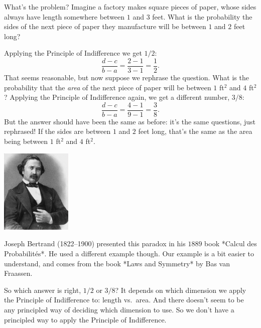 \documentclass[justified]{tufte-book}
\theoremstyle{definition}
\theoremstyle{definition}
\theoremstyle{definition}
\theoremstyle{remark}
\begin{document}
What's the problem? Imagine a factory makes square pieces of paper, whose sides always have length somewhere between \(1\) and \(3\) feet. What is the probability the sides of the next piece of paper they manufacture will be between \(1\) and \(2\) feet long?

Applying the Principle of Indifference we get \(1/2\):
\[ \frac{d-c}{b-a} = \frac{2-1}{3-1} = \frac{1}{2}. \]
That seems reasonable, but now suppose we rephrase the question. What is the probability that the \emph{area} of the next piece of paper will be between \(1\) ft\(^2\) and \(4\) ft\(^2\)? Applying the Principle of Indifference again, we get a different number, \(3/8\):
\[ \frac{d-c}{b-a} = \frac{4-1}{9-1} = \frac{3}{8}. \]
But the answer should have been the same as before: it's the same questions, just rephrased! If the sides are between \(1\) and \(2\) feet long, that's the same as the area being between \(1\) ft\(^2\) and \(4\) ft\(^2\).

\begin{marginfigure}
\includegraphics[width=1.33in]{img/bertrand} \caption[Joseph Bertrand (1822--1900) presented this paradox in his $1889$ book *Calcul des Probabilités*]{Joseph Bertrand (1822--1900) presented this paradox in his $1889$ book *Calcul des Probabilités*. He used a different example though. Our example is a bit easier to understand, and comes from the book *Laws and Symmetry* by Bas van Fraassen.}\label{fig:unnamed-chunk-137}
\end{marginfigure}

So which answer is right, \(1/2\) or \(3/8\)? It depends on which dimension we apply the Principle of Indifference to: length vs.~area. And there doesn't seem to be any principled way of deciding which dimension to use. So we don't have a principled way to apply the Principle of Indifference.
\end{document}
